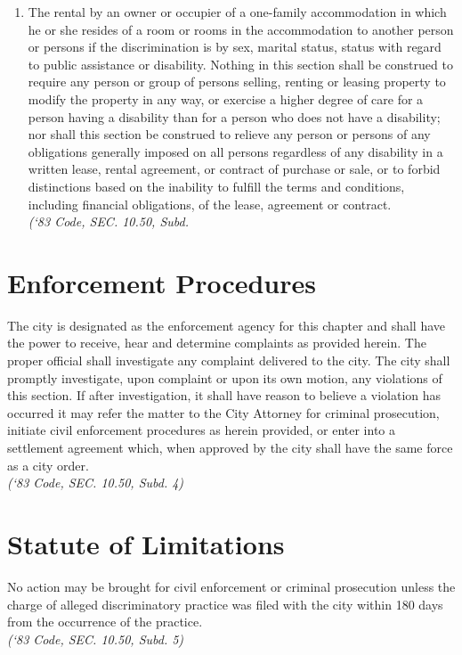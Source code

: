 \begin{enumerate}[{\indent}A)]
\begin{enumerate}
\item The rental by an owner or occupier of a one-family accommodation in which he or she resides of a room or rooms in the accommodation to another person or persons if the discrimination is by sex, marital status, status with regard to public assistance or disability. Nothing in this section shall be construed to require any person or group of persons selling, renting or leasing property to modify the property in any way, or exercise a higher degree of care for a person having a disability than for a person who does not have a disability; nor shall this section be construed to relieve any person or persons of any obligations generally imposed on all persons regardless of any disability in a written lease, rental agreement, or contract of purchase or sale, or to forbid distinctions based on the inability to fulfill the terms and conditions, including financial obligations, of the lease, agreement or contract.\\
\emph{(‘83 Code, SEC. 10.50, Subd.}
\end{enumerate}
\end{enumerate}

\section{Enforcement Procedures}
The city is designated as the enforcement agency for this chapter and shall have the power to receive, hear and determine complaints as provided herein. The proper official shall investigate any complaint delivered to the city. The city shall promptly investigate, upon complaint or upon its own motion, any violations of this section.  If after investigation, it shall have reason to believe a violation has occurred it may refer the matter to the City Attorney for criminal prosecution, initiate civil enforcement procedures as herein provided, or enter into a settlement agreement which, when approved by the city shall have the same force as a city order.\\
\emph{(‘83 Code, SEC. 10.50, Subd. 4)}

\section{Statute of Limitations}
No action may be brought for civil enforcement or criminal prosecution unless the charge of alleged discriminatory practice was filed with the city within 180 days from the occurrence of the practice.\\
\emph{(‘83 Code, SEC. 10.50, Subd. 5)}

